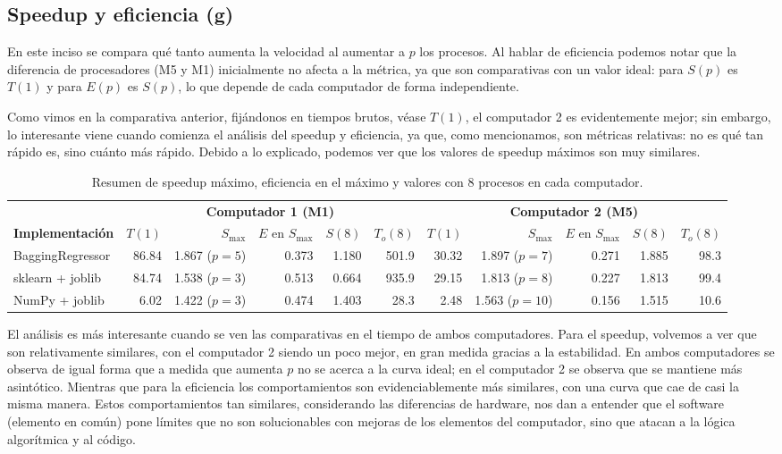 \documentclass[12pt, letterpaper]{article}
\begin{document}
\subsection*{Speedup y eficiencia (g)}

En este inciso se compara qué tanto aumenta la velocidad al aumentar a $p$ los procesos. Al hablar de eficiencia
podemos notar que la diferencia de procesadores (M5 y M1) inicialmente no afecta a la métrica, ya que son comparativas
con un valor ideal: para $S(p)$ es $T(1)$ y para $E(p)$ es $S(p)$, lo que depende de cada computador de forma independiente.

Como vimos en la comparativa anterior, fijándonos en tiempos brutos, véase $T(1)$, el computador 2
es evidentemente mejor; sin embargo, lo interesante viene cuando comienza el análisis del speedup y eficiencia,
ya que, como mencionamos, son métricas relativas: no es qué tan rápido es, sino cuánto más rápido. Debido a lo explicado,
podemos ver que los valores de speedup máximos son muy similares.

\begin{table}[H]
    \centering
    \scriptsize
    \begin{tabular}{|l|rrrrr|rrrrr|}
    \hline
     & \multicolumn{5}{c|}{\textbf{Computador 1 (M1)}} & \multicolumn{5}{c|}{\textbf{Computador 2 (M5)}} \\
    \textbf{Implementación} & $T(1)$ & $S_{\max}$ & $E$ en $S_{\max}$ & $S(8)$ & $T_o(8)$ & $T(1)$ & $S_{\max}$ & $E$ en $S_{\max}$ & $S(8)$ & $T_o(8)$ \\
    \hline
    BaggingRegressor & 86.84 & 1.867 ($p=5$) & 0.373 & 1.180 & 501.9 & 30.32 & 1.897 ($p=7$) & 0.271 & 1.885 & 98.3 \\
    sklearn + joblib & 84.74 & 1.538 ($p=3$) & 0.513 & 0.664 & 935.9 & 29.15 & 1.813 ($p=8$) & 0.227 & 1.813 & 99.4 \\
    NumPy + joblib & 6.02 & 1.422 ($p=3$) & 0.474 & 1.403 & 28.3 & 2.48 & 1.563 ($p=10$) & 0.156 & 1.515 & 10.6 \\
    \hline
    \end{tabular}
    \caption{Resumen de speedup máximo, eficiencia en el máximo y valores con 8 procesos en cada computador.}
    \label{tab:resumen-j}
\end{table}

El análisis es más interesante cuando se ven las comparativas en el tiempo de ambos computadores. Para el speedup, volvemos a ver que
son relativamente similares, con el computador 2 siendo un poco mejor, en gran medida gracias a la estabilidad. En ambos computadores
se observa de igual forma que a medida que aumenta $p$ no se acerca a la curva ideal; en el computador 2 se observa que se mantiene más asintótico.
Mientras que para la eficiencia los comportamientos son evidenciablemente más similares, con una curva que cae de casi la misma manera.
Estos comportamientos tan similares, considerando las diferencias de hardware, nos dan a entender que el software (elemento en común) pone límites
que no son solucionables con mejoras de los elementos del computador, sino que atacan a la lógica algorítmica y al código.
\end{document}

